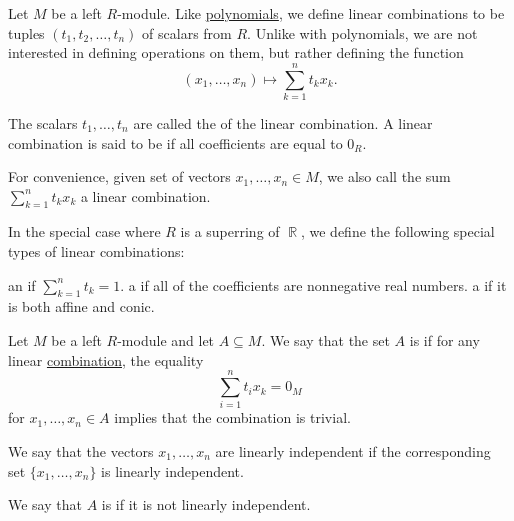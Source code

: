 \begin{definition}\label{def:linear_combination}
  Let \( M \) be a left \( R \)-module. Like \hyperref[def:polynomial]{polynomials}, we define linear combinations to be tuples \( (t_1, t_2, \ldots, t_n) \) of scalars from \( R \). Unlike with polynomials, we are not interested in defining operations on them, but rather defining the function
  \begin{equation}\label{def:linear_combination/function}
    (x_1, \ldots, x_n) \mapsto \sum_{k=1}^n t_k x_k.
  \end{equation}

  The scalars \( t_1, \ldots, t_n \) are called the  of the linear combination. A linear combination is said to be  if all coefficients are equal to \( 0_R \).

  For convenience, given set of vectors \( x_1, \ldots, x_n \in M \), we also call the sum \( \sum_{k=1}^n t_k x_k \) a linear combination.

  In the special case where \( R \) is a superring of \( \BbbR \), we define the following special types of linear combinations:
  \begin{thmenum}
     an  if \( \sum_{k=1}^n t_k = 1 \).
     a  if all of the coefficients are nonnegative real numbers.
     a  if it is both affine and conic.
  \end{thmenum}
\end{definition}

\begin{definition}\label{def:left_module_linear_dependence}
  Let \( M \) be a left \( R \)-module and let \( A \subseteq M \). We say that the set \( A \) is  if for any linear \hyperref[def:linear_combination/function]{combination}, the equality
  \begin{equation*}
    \sum_{i=1}^n t_i x_k = 0_M
  \end{equation*}
  for \( x_1, \ldots, x_n \in A \) implies that the combination is trivial.

  We say that the vectors \( x_1, \ldots, x_n \) are linearly independent if the corresponding set \( \{ x_1, \ldots, x_n \} \) is linearly independent.

  We say that \( A \) is  if it is not linearly independent.
\end{definition}

